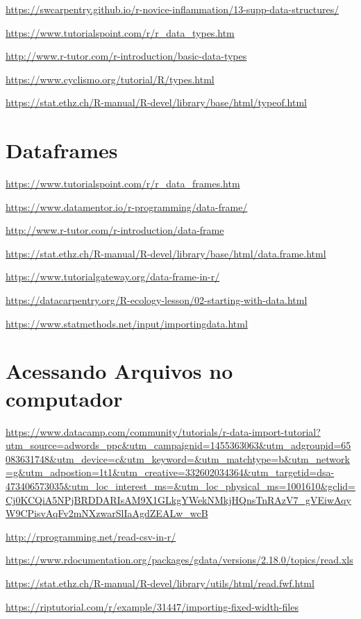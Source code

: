 \documentclass[12pt,a4paper,oneside]{erdc}
\begin{document}
\url{https://swcarpentry.github.io/r-novice-inflammation/13-supp-data-structures/}

\url{https://www.tutorialspoint.com/r/r_data_types.htm}

\url{http://www.r-tutor.com/r-introduction/basic-data-types}

\url{https://www.cyclismo.org/tutorial/R/types.html}

\url{https://stat.ethz.ch/R-manual/R-devel/library/base/html/typeof.html}

\section{Dataframes}

\url{https://www.tutorialspoint.com/r/r_data_frames.htm}

\url{https://www.datamentor.io/r-programming/data-frame/}

\url{http://www.r-tutor.com/r-introduction/data-frame}

\url{https://stat.ethz.ch/R-manual/R-devel/library/base/html/data.frame.html}

\url{https://www.tutorialgateway.org/data-frame-in-r/}

\url{https://datacarpentry.org/R-ecology-lesson/02-starting-with-data.html}

\url{https://www.statmethods.net/input/importingdata.html}

\section{Acessando Arquivos no computador}

\url{https://www.datacamp.com/community/tutorials/r-data-import-tutorial?utm_source=adwords_ppc&utm_campaignid=1455363063&utm_adgroupid=65083631748&utm_device=c&utm_keyword=&utm_matchtype=b&utm_network=g&utm_adpostion=1t1&utm_creative=332602034364&utm_targetid=dsa-473406573035&utm_loc_interest_ms=&utm_loc_physical_ms=1001610&gclid=Cj0KCQiA5NPjBRDDARIsAM9X1GLkgYWekNMkjHQnsTnRAzV7_gVEiwAqyW9CPisvAqFv2mNXzwarSlIaAgdZEALw_wcB}

\url{http://rprogramming.net/read-csv-in-r/}

\url{https://www.rdocumentation.org/packages/gdata/versions/2.18.0/topics/read.xls}

\url{https://stat.ethz.ch/R-manual/R-devel/library/utils/html/read.fwf.html}

\url{https://riptutorial.com/r/example/31447/importing-fixed-width-files}
\end{document}
